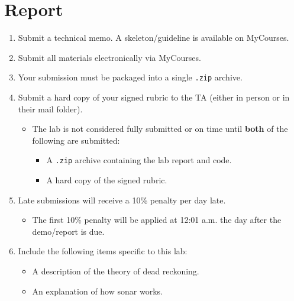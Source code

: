 \documentclass[12pt]{article}
\begin{document}
\section{Report}
\begin{enumerate}
  \item Submit a technical memo. A skeleton/guideline is available on MyCourses.

  \item Submit all materials electronically via MyCourses.

  \item Your submission must be packaged into a single \texttt{.zip} archive.

  \item Submit a hard copy of your signed rubric to the TA (either in person or in their mail folder).
  \begin{itemize}
    \item The lab is not considered fully submitted or on time until \textbf{both} of the following are submitted:
    \begin{itemize}
      \item A \texttt{.zip} archive containing the lab report and code.
      \item A hard copy of the signed rubric.
    \end{itemize}
  \end{itemize}

  \item Late submissions will receive a 10\% penalty per day late.
  \begin{itemize}
    \item The first 10\% penalty will be applied at 12:01 a.m. the day after the demo/report is due.
  \end{itemize}

  \item Include the following items specific to this lab:
  \begin{itemize}
    \item A description of the theory of dead reckoning.
    \item An explanation of how sonar works.
  \end{itemize}
\end{enumerate}
\end{document}
